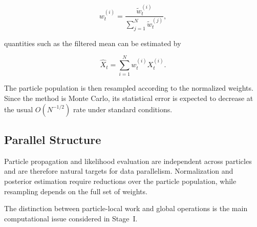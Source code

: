 \begin{equation}
	w_t^{(i)}
	=
	\frac{\widetilde{w}_t^{(i)}}
	{\sum_{j=1}^{N}\widetilde{w}_t^{(j)}},
\end{equation}

quantities such as the filtered mean can be estimated by

\begin{equation}
	\widehat{X}_t
	=
	\sum_{i=1}^{N} w_t^{(i)}X_t^{(i)}.
\end{equation}

The particle population is then resampled according to the normalized
weights. Since the method is Monte Carlo, its statistical error is
expected to decrease at the usual \(O(N^{-1/2})\) rate under standard
conditions.


\subsection{Parallel Structure}
\label{subsec:pf-parallel-structure}

Particle propagation and likelihood evaluation are independent across
particles and are therefore natural targets for data parallelism.
Normalization and posterior estimation require reductions over the
particle population, while resampling depends on the full set of
weights.

The distinction between particle-local work and global operations is the
main computational issue considered in Stage~I.